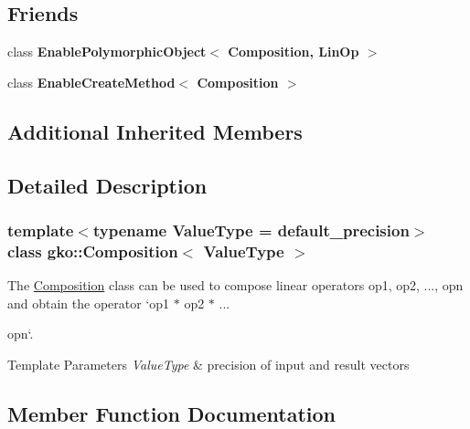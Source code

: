 \subsection*{Friends}
\begin{DoxyCompactItemize}
\item 
\mbox{\label{classgko_1_1Composition_afa7c3f077edf67d0b19255dd78af3ecb}} 
class {\bfseries Enable\+Polymorphic\+Object$<$ Composition, Lin\+Op $>$}
\item 
\mbox{\label{classgko_1_1Composition_a0350dc3dedd61760b46c3afd62943e6c}} 
class {\bfseries Enable\+Create\+Method$<$ Composition $>$}
\end{DoxyCompactItemize}
\subsection*{Additional Inherited Members}


\subsection{Detailed Description}
\subsubsection*{template$<$typename Value\+Type = default\+\_\+precision$>$\newline
class gko\+::\+Composition$<$ Value\+Type $>$}

The \hyperlink{classgko_1_1Composition}{Composition} class can be used to compose linear operators {\ttfamily op1, op2, ..., opn} and obtain the operator `op1 $\ast$ op2 $\ast$ ... 


\begin{DoxyItemize}
\item opn`.
\end{DoxyItemize}


\begin{DoxyTemplParams}{Template Parameters}
{\em Value\+Type} & precision of input and result vectors \\
\hline
\end{DoxyTemplParams}


\subsection{Member Function Documentation}
\mbox{\label{classgko_1_1Composition_a196507096c635aba24e1074050827c68}} 
